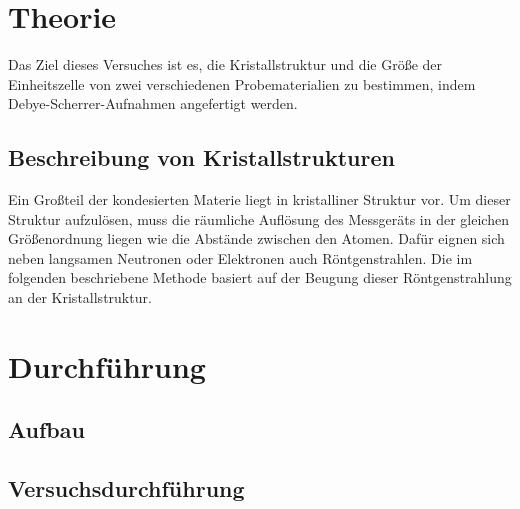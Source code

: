 \section{Theorie}
Das Ziel dieses Versuches ist es, die Kristallstruktur und die Größe der Einheitszelle
von zwei verschiedenen Probematerialien zu bestimmen, indem Debye-Scherrer-Aufnahmen
angefertigt werden.

\subsection{Beschreibung von Kristallstrukturen}
Ein Großteil der kondesierten Materie liegt in kristalliner Struktur vor.
Um dieser Struktur aufzulösen, muss die räumliche Auflösung des Messgeräts in der
gleichen Größenordnung liegen wie die Abstände zwischen den Atomen. Dafür eignen sich
neben langsamen Neutronen oder Elektronen auch Röntgenstrahlen. Die im folgenden
beschriebene Methode basiert auf der Beugung dieser Röntgenstrahlung an der Kristallstruktur.

\section{Durchführung}
\subsection{Aufbau}
\subsection{Versuchsdurchführung}
